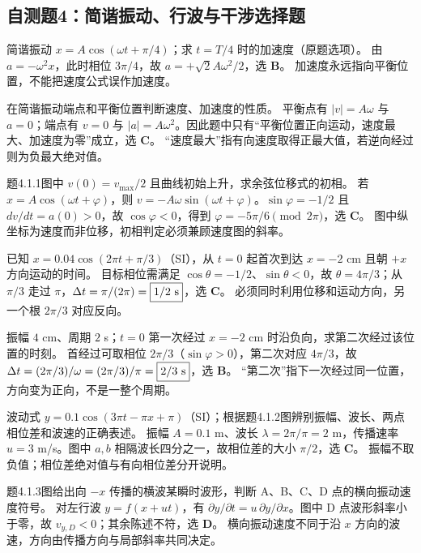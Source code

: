 \subsection{自测题4：简谐振动、行波与干涉选择题}

\problemtext 简谐振动 $x=A\cos(\omega t+\pi/4)$；求 $t=T/4$ 时的加速度（原题选项）。
\workings 由 $a=-\omega^2x$，此时相位 $3\pi/4$，故 $\boxed{a=+\sqrt2 A\omega^2/2}$，选 \textbf{B}。
\crosscheck 加速度永远指向平衡位置，不能把速度公式误作加速度。

\problemtext 在简谐振动端点和平衡位置判断速度、加速度的性质。
\workings 平衡点有 $|v|=A\omega$ 与 $a=0$；端点有 $v=0$ 与 $|a|=A\omega^2$。因此题中只有“平衡位置正向运动，速度最大、加速度为零”成立，选 \textbf{C}。
\crosscheck “速度最大”指有向速度取得正最大值，若逆向经过则为负最大绝对值。

\problemtext 题4.1.1图中 $v(0)=v_{\max}/2$ 且曲线初始上升，求余弦位移式的初相。
\workings 若 $x=A\cos(\omega t+\varphi)$，则 $v=-A\omega\sin(\omega t+\varphi)$。$\sin\varphi=-1/2$ 且 $dv/dt=a(0)>0$，故 $\cos\varphi<0$，得到 $\boxed{\varphi=-5\pi/6\pmod{2\pi}}$，选 \textbf{C}。
\crosscheck 图中纵坐标为速度而非位移，初相判定必须兼顾速度图的斜率。

\problemtext 已知 $x=0.04\cos(2\pi t+\pi/3)$（SI），从 $t=0$ 起首次到达 $x=-2$ cm 且朝 $+x$ 方向运动的时间。
\workings 目标相位需满足 $\cos\theta=-1/2$、$\sin\theta<0$，故 $\theta=4\pi/3$；从 $\pi/3$ 走过 $\pi$，$\Delta t=\pi/(2\pi)=\boxed{1/2\ {\rm s}}$，选 \textbf{C}。
\crosscheck 必须同时利用位移和运动方向，另一个根 $2\pi/3$ 对应反向。

\problemtext 振幅 $4$ cm、周期 $2$ s；$t=0$ 第一次经过 $x=-2$ cm 时沿负向，求第二次经过该位置的时刻。
\workings 首经过可取相位 $2\pi/3$（$\sin\varphi>0$），第二次对应 $4\pi/3$，故 $\Delta t=(2\pi/3)/\omega=(2\pi/3)/\pi=\boxed{2/3\ {\rm s}}$，选 \textbf{B}。
\crosscheck “第二次”指下一次经过同一位置，方向变为正向，不是一整个周期。

\problemtext 波动式 $y=0.1\cos(3\pi t-\pi x+\pi)$（SI）；根据题4.1.2图辨别振幅、波长、两点相位差和波速的正确表述。
\workings 振幅 $A=0.1$ m、波长 $\lambda=2\pi/\pi=2$ m，传播速率 $u=3$ m/s。图中 $a,b$ 相隔波长四分之一，故相位差的大小 $\pi/2$，选 \textbf{C}。
\crosscheck 振幅不取负值；相位差绝对值与有向相位差分开说明。

\problemtext 题4.1.3图给出向 $-x$ 传播的横波某瞬时波形，判断 A、B、C、D 点的横向振动速度符号。
\workings 对左行波 $y=f(x+ut)$，有 $\partial y/\partial t=u\,\partial y/\partial x$。图中 D 点波形斜率小于零，故 $v_{y,D}<0$；其余陈述不符，选 \textbf{D}。
\crosscheck 横向振动速度不同于沿 $x$ 方向的波速，方向由传播方向与局部斜率共同决定。


